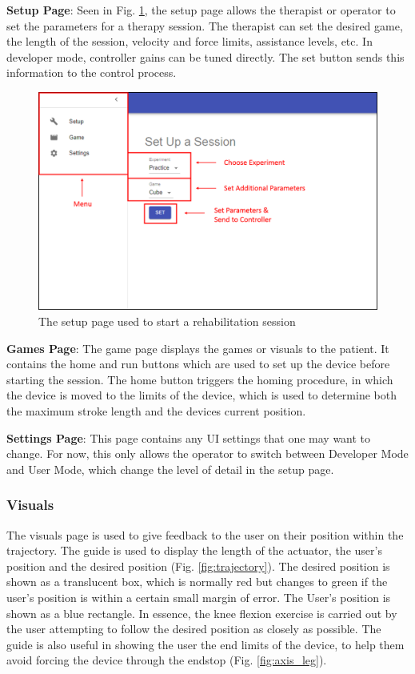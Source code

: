 \documentclass[12pt]{report}
\begin{document}
\textbf{Setup Page}: Seen in Fig. \ref{fig:ui-menu}, the setup page allows the therapist or operator to set the parameters for a therapy session. The therapist can set the desired game, the length of the session, velocity and force limits, assistance levels, etc. In developer mode, controller gains can be tuned directly. The set button sends this information to the control process. 

	\begin{figure}[h] 
		\centering
		\includegraphics[width=0.9\linewidth]{UI_menu_label}
		\caption{The setup page used to start a rehabilitation session}
		\label{fig:ui-menu}
	\end{figure} 	
		
\textbf{Games Page}: The game page displays the games or visuals to the patient. It contains the home and run buttons which are used to set up the device before starting the session. The home button triggers the homing procedure, in which the device is moved to the limits of the device, which is used to determine both the maximum stroke length and the devices current position. 

\textbf{Settings Page}: This page contains any UI settings that one may want to change. For now, this only allows the operator to switch between Developer Mode and User Mode, which change the level of detail in the setup page. 		
		
		\subsubsection{Visuals} \label{sec:visuals} 
				
		The visuals page is used to give feedback to the user on their position within the trajectory. The guide is used to display the length of the actuator, the user's position and the desired position (Fig. \ref{fig:trajectory}). The desired position is shown as a translucent box, which is normally red but changes to green if the user's position is within a certain small margin of error. The User's position is shown as a blue rectangle. In essence, the knee flexion exercise is carried out by the user attempting to follow the desired position as closely as possible. The guide is also useful in showing the user the end limits of the device, to help them avoid forcing the device through the endstop (Fig. \ref{fig:axis_leg}).
		
\end{document}
